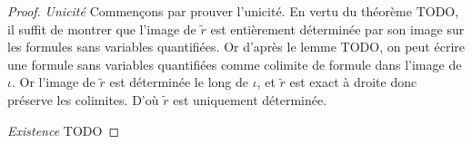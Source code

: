 \begin{proof}
    \emph{Unicité} Commençons par prouver l'unicité. En vertu du théorème TODO, il suffit
    de montrer que l'image de $\tilde{r}$ est entièrement déterminée par son image
    sur les formules sans variables quantifiées. Or d'après le lemme TODO,
    on peut écrire une formule sans variables quantifiées comme colimite de formule
    dans l'image de $\iota$. Or l'image de $\tilde{r}$ est déterminée le long de $\iota$,
    et $\tilde{r}$ est exact à droite donc préserve les colimites. D'où $\tilde{r}$
    est uniquement déterminée.

    \emph{Existence} TODO
\end{proof}


